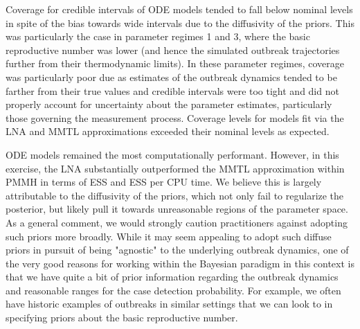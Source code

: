 Coverage for credible intervals of ODE models tended to fall below nominal levels in spite of the bias towards wide intervals due to the diffusivity of the priors. This was particularly the case in parameter regimes 1 and 3, where the basic reproductive number was lower (and hence the simulated outbreak trajectories further from their thermodynamic limits). In these parameter regimes, coverage was particularly poor due as estimates of the outbreak dynamics tended to be farther from their true values and credible intervals were too tight and did not properly account for uncertainty about the parameter estimates, particularly those governing the measurement process. Coverage levels for models fit via the LNA and MMTL approximations exceeded their nominal levels as expected. 

ODE models remained the most computationally performant. However, in this exercise, the LNA substantially outperformed the MMTL approximation within PMMH in terms of ESS and ESS per CPU time. We believe this is largely attributable to the diffusivity of the priors, which not only fail to regularize the posterior, but likely pull it towards unreasonable regions of the parameter space. As a general comment, we would strongly caution practitioners against adopting such priors more broadly. While it may seem appealing to adopt such diffuse priors in pursuit of being "agnostic" to the underlying outbreak dynamics, one of the very good reasons for working within the Bayesian paradigm in this context is that we have quite a bit of prior information regarding the outbreak dynamics and reasonable ranges for the case detection probability. For example, we often have historic examples of outbreaks in similar settings that we can look to in specifying priors about the basic reproductive number.

